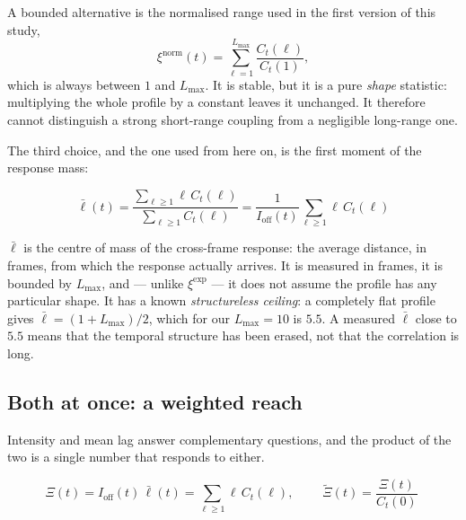 \documentclass[11pt,a4paper]{article}
\begin{document}
A bounded alternative is the normalised range used in the first version of this study,
\begin{equation}
 \xi^{\mathrm{norm}}(t)=\sum_{\ell=1}^{L_{\max}}\frac{C_t(\ell)}{C_t(1)} ,
 \label{eq:normalised-range}
\end{equation}
which is always between $1$ and $L_{\max}$. It is stable, but it is a pure \emph{shape}
statistic: multiplying the whole profile by a constant leaves it unchanged. It therefore
cannot distinguish a strong short-range coupling from a negligible long-range one.

The third choice, and the one used from here on, is the first moment of the response mass:

\begin{definitionbox}
\begin{equation}
 \bar\ell(t)=\frac{\sum_{\ell\ge1}\ell\,C_t(\ell)}{\sum_{\ell\ge1}C_t(\ell)}
 =\frac{1}{I_{\mathrm{off}}(t)}\sum_{\ell\ge1}\ell\,C_t(\ell)
 \label{eq:mean-lag}
\end{equation}
\end{definitionbox}

$\bar\ell$ is the centre of mass of the cross-frame response: the average distance, in frames,
from which the response actually arrives. It is measured in frames, it is bounded by
$L_{\max}$, and --- unlike $\xi^{\mathrm{exp}}$ --- it does not assume the profile has any
particular shape. It has a known \emph{structureless ceiling}: a completely flat profile gives
$\bar\ell=(1+L_{\max})/2$, which for our $L_{\max}=10$ is $5.5$. A measured $\bar\ell$ close
to $5.5$ means that the temporal structure has been erased, not that the correlation is long.

\subsection{Both at once: a weighted reach}\label{sec:weighted-reach}

Intensity and mean lag answer complementary questions, and the product of the two is a single
number that responds to either.

\begin{definitionbox}
\begin{equation}
 \Xi(t)=I_{\mathrm{off}}(t)\,\bar\ell(t)=\sum_{\ell\ge1}\ell\,C_t(\ell),
 \qquad
 \boxed{\;\widetilde\Xi(t)=\frac{\Xi(t)}{C_t(0)}\;}
 \label{eq:weighted-reach}
\end{equation}
\end{definitionbox}
\end{document}

